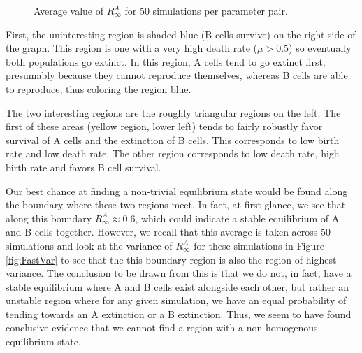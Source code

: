 \documentclass[12pt,letterpaper,cm]{article}
\renewcommand{\.}{\cdot}
\newcommand{\<}{\langle}
\renewcommand{\>}{\rangle}
\begin{document}
	
	\begin{figure}[hbt]
		\centering
		
		\caption{Average value of $R_\infty^A$ for 50 simulations per parameter pair.}
		\label{fig:FastAvg}
		
	\end{figure}


	First, the uninteresting region is shaded blue (B cells survive) on the right side of the graph. This region is one with a very high death rate ($\mu > 0.5$) so eventually both populations go extinct. In this region, A cells tend to go extinct first, presumably because they cannot reproduce themselves, whereas B cells are able to reproduce, thus coloring the region blue.
	
	The two interesting regions are the roughly triangular regions on the left. The first of these areas (yellow region, lower left) tends to fairly robustly favor survival of A cells and the extinction of B cells. This corresponds to low birth rate and low death rate. The other region corresponds to low death rate, high birth rate and favors B cell survival.
	
	Our best chance at finding a non-trivial equilibrium state would be found along the boundary where these two regions meet. In fact, at first glance, we see that along this boundary $R_\infty^A \approx 0.6$, which could indicate a stable equilibrium of A and B cells together. However, we recall that this average is taken across 50 simulations and look at the variance of $R_\infty^A$ for these simulations in Figure \ref{fig:FastVar} to see that the this boundary region is also the region of highest variance. The conclusion to be drawn from this is that we do not, in fact, have a stable equilibrium where A and B cells exist alongside each other, but rather an unstable region where for any given simulation, we have an equal probability of tending towards an A extinction or a B extinction. Thus, we seem to have found conclusive evidence that we cannot find a region with a non-homogenous equilibrium state. 
	
\end{document}
